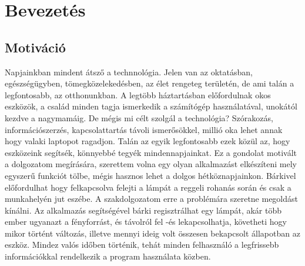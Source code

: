 \documentclass[a4paper,12pt]{report}
\begin{document}




\setcounter{page}{1}


\tableofcontents



\chapter{Bevezetés}

\section{Motiváció}
    Napjainkban mindent átsző a technnológia. Jelen van az oktatásban, egészségügyben, tömegközelekedésben, az élet rengeteg
    területén, de ami talán a legfontosabb, az otthonunkban. A legtöbb háztartásban előfordulnak okos eszközök, a család
    minden tagja ismerkedik a számítógép használatával, unokától kezdve a nagymamáig. De mégis mi célt szolgál a technológia?
    Szórakozás, információszerzés, kapcsolattartás távoli ismerősökkel, millió oka lehet annak hogy valaki laptopot ragadjon.
    Talán az egyik legfontosabb ezek közül az, hogy eszközeink segítsék, könnyebbé tegyék mindennapjainkat. Ez a gondolat
    motivált a dolgozatom megírására, szerettem volna egy olyan alkalmazást elkészíteni mely egyszerű funkciót tölbe, mégis
    hasznos lehet a dolgos hétköznapjainkon. Bárkivel előfordulhat hogy felkapcsolva felejti a lámpát a reggeli rohanás során
    és csak a munkahelyén jut eszébe. A szakdolgozatom erre a problémára szeretne megoldást kínálni. Az alkalmazás segítségével
    bárki regisztrálhat egy lámpát, akár több ember ugyanazt a fényforrást, és távolról fel -és lekapcsolhatja, követheti hogy
    mikor történt változás, illetve mennyi ideig volt összesen bekapcsolt állapotban az eszköz. Mindez valós időben történik,
    tehát minden felhasználó a legfrissebb információkkal rendelkezik a program használata közben.
\end{document}
